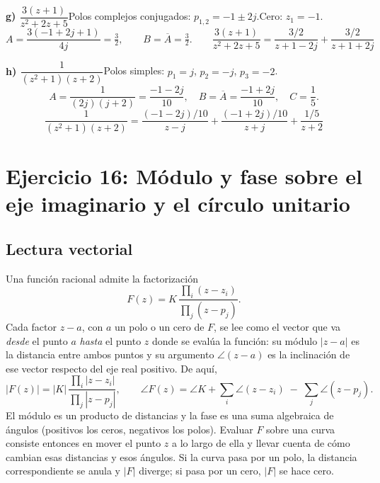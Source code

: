 \documentclass[10pt,a4paper]{article}
\begin{document}
\begin{figure}[H]
\centering

\end{figure}


\medskip

\noindent\textbf{g) $\dfrac{3(z+1)}{z^2+2z+5}$}\quad Polos complejos conjugados: $p_{1,2}=-1\pm 2j$.\quad Cero: $z_1=-1$.
\[
	A = \frac{3(-1+2j+1)}{4j} = \tfrac{3}{2}, \qquad B = \overline{A} = \tfrac{3}{2}.
	\qquad
	\boxed{\frac{3(z+1)}{z^2+2z+5} = \frac{3/2}{z+1-2j} + \frac{3/2}{z+1+2j}}
\]

\begin{figure}[H]
\centering

\end{figure}


\medskip

\noindent\textbf{h) $\dfrac{1}{(z^2+1)(z+2)}$}\quad Polos simples: $p_1=j$, $p_2=-j$, $p_3=-2$.
\[
	A = \frac{1}{(2j)(j+2)} = \frac{-1-2j}{10}, \quad
	B = \overline{A} = \frac{-1+2j}{10}, \quad
	C = \frac{1}{5}.
\]
\[
	\boxed{\frac{1}{(z^2+1)(z+2)} = \frac{(-1-2j)/10}{z-j} + \frac{(-1+2j)/10}{z+j} + \frac{1/5}{z+2}}
\]

\bigskip


\section*{Ejercicio 16: Módulo y fase sobre el eje imaginario y el círculo unitario}

\subsection*{Lectura vectorial}

Una función racional admite la factorización
\[
	F(z) = K\,\frac{\prod_i (z-z_i)}{\prod_j (z-p_j)}.
\]
Cada factor $z-a$, con $a$ un polo o un cero de $F$, se lee como el vector que va \emph{desde} el punto $a$ \emph{hasta} el punto $z$ donde se evalúa la función: su módulo $|z-a|$ es la distancia entre ambos puntos y su argumento $\angle(z-a)$ es la inclinación de ese vector respecto del eje real positivo. De aquí,
\[
	|F(z)| = |K|\,\frac{\prod_i |z-z_i|}{\prod_j |z-p_j|},\qquad
	\angle F(z) = \angle K + \sum_i \angle(z-z_i) \;-\; \sum_j \angle(z-p_j).
\]
El módulo es un producto de distancias y la fase es una suma algebraica de ángulos (positivos los ceros, negativos los polos). Evaluar $F$ sobre una curva consiste entonces en mover el punto $z$ a lo largo de ella y llevar cuenta de cómo cambian esas distancias y esos ángulos. Si la curva pasa por un polo, la distancia correspondiente se anula y $|F|$ diverge; si pasa por un cero, $|F|$ se hace cero.
\end{document}
